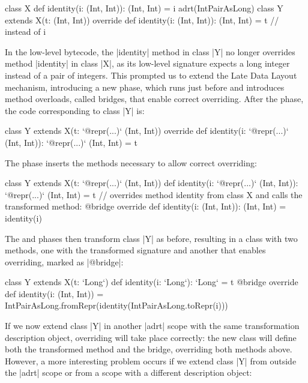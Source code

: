 \begin{lstlisting-nobreak}
class X {
  def identity(i: (Int, Int)): (Int, Int) = i
}
adrt(IntPairAsLong) {
  class Y extends X(t: (Int, Int)) {
    override def identity(i: (Int, Int)): (Int, Int) = t // instead of i
  }
}
\end{lstlisting-nobreak}

In the low-level bytecode, the |identity| method in class |Y| no longer overrides method |identity| in class |X|, as its low-level signature expects a long integer instead of a pair of integers. This prompted us to extend the Late Data Layout mechanism, introducing a new \bridge{} phase, which runs just before \coerce{} and introduces method overloads, called bridges, that enable correct overriding. After the \inject{} phase, the code corresponding to class |Y| is:

\begin{lstlisting-nobreak}
class Y extends X(t: `@repr(...)` (Int, Int)) {
  override def identity(i: `@repr(...)` (Int, Int)): `@repr(...)` (Int, Int) = t
}
\end{lstlisting-nobreak}

The \bridge{} phase inserts the methods necessary to allow correct overriding:

\begin{lstlisting-nobreak}
class Y extends X(t: `@repr(...)` (Int, Int)) {
  def identity(i: `@repr(...)` (Int, Int)): `@repr(...)` (Int, Int) = t
  // overrides method identity from class X and calls the transformed method:
  @bridge override def identity(i: (Int, Int)): (Int, Int) = identity(i)
}
\end{lstlisting-nobreak}

The \coerce{} and \commit{} phases then transform class |Y| as before, resulting in a class with two methods, one with the transformed signature and another that enables overriding, marked as |@bridge|:

\begin{lstlisting-nobreak}
class Y extends X(t: `Long`) {
  def identity(i: `Long`): `Long` = t
  @bridge override def identity(i: (Int, Int)) =
    IntPairAsLong.fromRepr(identity(IntPairAsLong.toRepr(i)))
}
\end{lstlisting-nobreak}

If we now extend class |Y| in another |adrt| scope with the same transformation description object, overriding will take place correctly: the new class will define both the transformed method and the bridge, overriding both methods above. However, a more interesting problem occurs if we extend class |Y| from outside the |adrt| scope or from a scope with a different description object:

